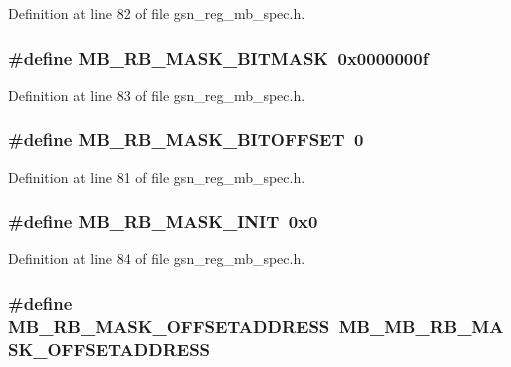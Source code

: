 Definition at line 82 of file gsn\_\-reg\_\-mb\_\-spec.h.

\hypertarget{a00562_a3d5c1db480746dfeb075fae64423981d}{
\subsubsection[{MB\_\-RB\_\-MASK\_\-BITMASK}]{\setlength{\rightskip}{0pt plus 5cm}\#define MB\_\-RB\_\-MASK\_\-BITMASK~0x0000000f}}
\label{a00562_a3d5c1db480746dfeb075fae64423981d}


Definition at line 83 of file gsn\_\-reg\_\-mb\_\-spec.h.

\hypertarget{a00562_ab3eeb3c34f259a44c98411bcd37e45e4}{
\subsubsection[{MB\_\-RB\_\-MASK\_\-BITOFFSET}]{\setlength{\rightskip}{0pt plus 5cm}\#define MB\_\-RB\_\-MASK\_\-BITOFFSET~0}}
\label{a00562_ab3eeb3c34f259a44c98411bcd37e45e4}


Definition at line 81 of file gsn\_\-reg\_\-mb\_\-spec.h.

\hypertarget{a00562_a848d6aa4804d662e99117a47ec5bee49}{
\subsubsection[{MB\_\-RB\_\-MASK\_\-INIT}]{\setlength{\rightskip}{0pt plus 5cm}\#define MB\_\-RB\_\-MASK\_\-INIT~0x0}}
\label{a00562_a848d6aa4804d662e99117a47ec5bee49}


Definition at line 84 of file gsn\_\-reg\_\-mb\_\-spec.h.

\hypertarget{a00562_a7004e3d77b0ac9010769868c101d3350}{
\subsubsection[{MB\_\-RB\_\-MASK\_\-OFFSETADDRESS}]{\setlength{\rightskip}{0pt plus 5cm}\#define MB\_\-RB\_\-MASK\_\-OFFSETADDRESS~MB\_\-MB\_\-RB\_\-MASK\_\-OFFSETADDRESS}}
\label{a00562_a7004e3d77b0ac9010769868c101d3350}


